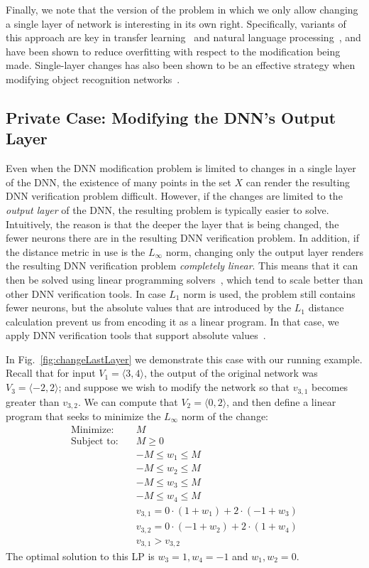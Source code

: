 \documentclass{easychair}
\begin{document}
Finally, we note that the version of the problem in which
we only allow changing a single layer of network is interesting in
its own right. Specifically, variants of this approach are key in
transfer learning~\cite{Gi15,GrDoDaMa14,WeVeWa07,YoClBeLi14} and
natural language processing~\cite{DeChLeTo18,PeNeIvGaClLeZe18,SiZi14},
and have been shown to reduce overfitting with respect to the modification being
made. Single-layer changes has also been shown to be an effective
strategy when modifying  object recognition networks~\cite{ShAzSuCa14}.

\subsection{Private Case: Modifying the DNN's Output Layer}
\label{sec:outputLayer}

Even when the DNN modification problem is limited to changes in a
single layer of the DNN, the existence of many points in the set $X$
can render the resulting DNN verification problem difficult. However, if the changes are limited to the \emph{output
  layer} of the DNN, the resulting problem is typically easier to
solve. Intuitively, the reason is that the deeper the layer that is being changed,
the fewer neurons there are in the resulting DNN verification problem.
In addition, if the distance metric in use is the $L_\infty$ norm,
changing only the output layer renders the resulting DNN verification
problem \emph{completely linear}. This means that it can then be solved using
linear programming solvers~\cite{TjXiTe19}, which tend to scale better than other DNN
verification tools. In case $L_1$ norm is used, the problem still
contains fewer neurons, but the absolute values that are introduced by
the $L_1$ distance calculation prevent us from encoding it as a linear
program. In that case, we apply DNN verification tools that support
absolute values~\cite{KaHuIbJuLaLiShThWuZeDiKoBa19Marabou}.

In Fig.~\ref{fig:changeLastLayer} we demonstrate this case with our running example.
Recall that for input $V_1=\langle 3,4\rangle$, the output of the
original network  was $V_3=\langle -2,2 \rangle$; and suppose we wish
to modify the network so that $v_{3,1}$ becomes greater than $v_{3,2}$.
We can compute that $V_2=\langle 0,2\rangle$, and then define a linear
program that seeks to minimize the $L_\infty$ norm of the change:
\begin{align*}
\text{Minimize}:\quad & M \\
  \text{Subject to}:\quad &M\geq 0\\
& -M \leq w_1\leq M \\
& -M \leq w_2\leq M \\
& -M \leq w_3\leq M \\
& -M \leq w_4\leq M \\
& v_{3,1}=0\cdot(1+w_1)+2\cdot(-1+w_3)\\
& v_{3,2}=0\cdot(-1+w_2)+2\cdot(1+w_4)\\
& v_{3,1} > v_{3,2}
\end{align*}
The optimal solution to this LP is $w_3=1,w_4=-1$ and $w_1,w_2=0$. 
\end{document}
